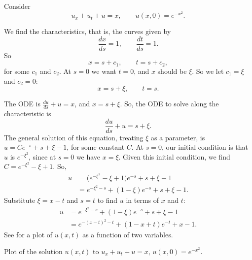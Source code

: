 \documentclass{ximera}
\begin{document}
\begin{example}
    Consider
    \begin{equation*}
        u_x + u_t + u = x, \qquad u(x,0) = e^{-x^2} .
    \end{equation*}
\end{example}
\begin{exampleSol}
    We find the characteristics, that is, the curves given by
    \begin{equation*}
        \frac{dx}{ds} = 1, \qquad \frac{dt}{ds} = 1 .
    \end{equation*}
    So
    \begin{equation*}
        x = s + c_1, \qquad t = s+ c_2 ,
    \end{equation*}
    for some $c_1$ and $c_2$. At $s=0$ we want $t=0$, and $x$ should be $\xi$.  So we let $c_1 = \xi$ and $c_2 = 0$:
    \begin{equation*}
        x = s + \xi, \qquad t = s .
    \end{equation*}
    
    The ODE is $\frac{du}{ds} + u = x$, and $x = s+\xi$. So, the ODE to solve along the characteristic is
    \begin{equation*}
        \frac{du}{ds} + u = s+ \xi .
    \end{equation*}
    The general solution of this equation, treating $\xi$ as a parameter, is  $u = C e^{-s}+s+\xi-1$, for some constant $C$. At $s=0$, our initial condition is that $u$ is $e^{-\xi^2}$, since at $s=0$ we have $x=\xi$. Given this initial condition, we find $C=e^{-\xi^2} - \xi +1$.  So,
    \begin{equation*}
        \begin{split}
            u & =
            \bigl(e^{-\xi^2} - \xi +1\bigr) e^{-s}+s+\xi-1 \\
            & = e^{-\xi^2-s} + (1 - \xi) e^{-s} +s+\xi-1 .
        \end{split}
    \end{equation*}
    Substitute $\xi = x-t$ and $s=t$ to find $u$ in terms of $x$ and $t$:
    \begin{equation*}
        \begin{split}
            u & = e^{-\xi^2-s} + (1 - \xi) e^{-s} +s+\xi-1  \\
            & = e^{-{(x-t)}^2-t} + (1 - x + t) e^{-t} +x-1 .
        \end{split}
    \end{equation*}
    See  for a plot of $u(x,t)$ as a function of two variables.
    \begin{myfig}
        \capstart
        \caption{Plot of the solution $u(x,t)$ to
        $u_x + u_t + u = x$,  $u(x,0) = e^{-x^2}$.\label{fopde:surfaceplot}}
    \end{myfig}
\end{exampleSol}
\end{document}
